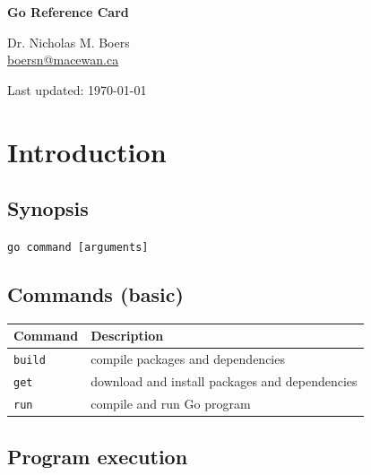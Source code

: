 \documentclass{article}
\begin{document}
\raggedright

\begin{multicols*}{3}
  \footnotesize

  \begin{center}
    {\Large{}\bfseries{}Go Reference Card}

    Dr. Nicholas M. Boers\\
    \url{boersn@macewan.ca}\\

    \vspace{1em}
    Last updated: \today
  \end{center}

  \filbreak
  \section*{Introduction}

  \subsection*{Synopsis}

  \texttt{go command [arguments]}

  \subsection*{Commands (basic)}

  \begin{tabular}{p{0.5in}p{2.5in}}
    \toprule
    \textbf{Command} & \textbf{Description} \\
    \midrule
    \texttt{build} & compile packages and dependencies \\
    \texttt{get} & download and install packages and dependencies \\
    \texttt{run} & compile and run Go program \\
    \bottomrule
  \end{tabular}

  \subsection*{Program execution}


\end{multicols*}
\end{document}
